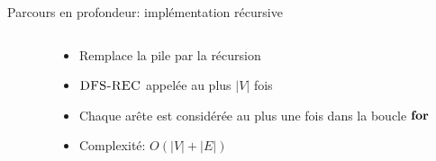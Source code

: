 \begin{frame}{Parcours en profondeur: implémentation récursive}

\begin{columns}
\begin{column}{5cm}
\begin{center}
{\small
{}

\bigskip

}
\end{center}
\end{column}
\begin{column}{5.5cm}
\begin{itemize}
\item Remplace la pile par la récursion
\bigskip
\item $\textnormal{\scshape DFS-REC}$ appelée au plus $|V|$ fois
\item Chaque arête est considérée au plus une fois dans la boucle $\textbf{for}$
\item Complexité: $O(|V|+|E|)$
\end{itemize}
\end{column}
\end{columns}


\end{frame}

